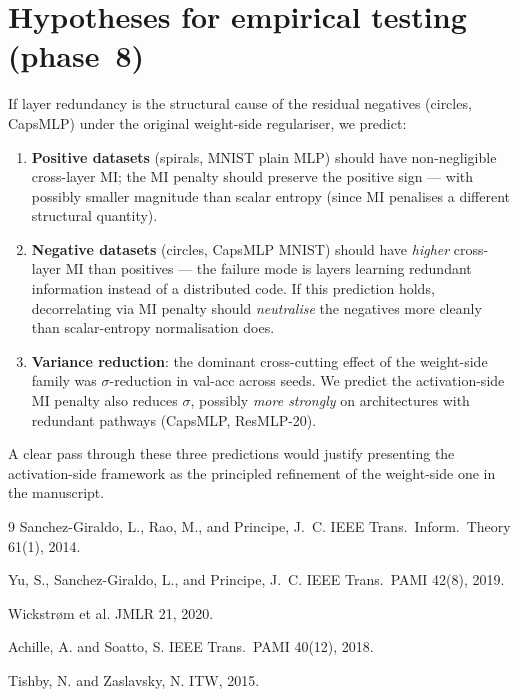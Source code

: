 \documentclass[11pt,a4paper]{article}
\begin{document}
\section{Hypotheses for empirical testing (phase~8)}

If layer redundancy is the structural cause of the residual negatives
(circles, CapsMLP) under the original weight-side regulariser, we
predict:
\begin{enumerate}
  \item \textbf{Positive datasets} (spirals, MNIST plain MLP) should
        have non-negligible cross-layer MI; the MI penalty should
        preserve the positive sign --- with possibly smaller magnitude
        than scalar entropy (since MI penalises a different structural
        quantity).
  \item \textbf{Negative datasets} (circles, CapsMLP MNIST) should have
        \emph{higher} cross-layer MI than positives --- the failure mode
        is layers learning redundant information instead of a
        distributed code. If this prediction holds, decorrelating via MI
        penalty should \emph{neutralise} the negatives more cleanly than
        scalar-entropy normalisation does.
  \item \textbf{Variance reduction}: the dominant cross-cutting effect
        of the weight-side family was $\sigma$-reduction in val-acc
        across seeds. We predict the activation-side MI penalty also
        reduces $\sigma$, possibly \emph{more strongly} on architectures
        with redundant pathways (CapsMLP, ResMLP-20).
\end{enumerate}

A clear pass through these three predictions would justify presenting
the activation-side framework as the principled refinement of the
weight-side one in the manuscript.


\begin{thebibliography}{9}
Sanchez-Giraldo, L., Rao, M., and Principe, J.~C.
\newblock IEEE Trans.\ Inform.\ Theory 61(1), 2014.

Yu, S., Sanchez-Giraldo, L., and Principe, J.~C.
\newblock IEEE Trans.\ PAMI 42(8), 2019.

Wickstr\o m et al.
\newblock JMLR 21, 2020.

Achille, A. and Soatto, S.
\newblock IEEE Trans.\ PAMI 40(12), 2018.

Tishby, N. and Zaslavsky, N.
\newblock ITW, 2015.
\end{thebibliography}
\end{document}
